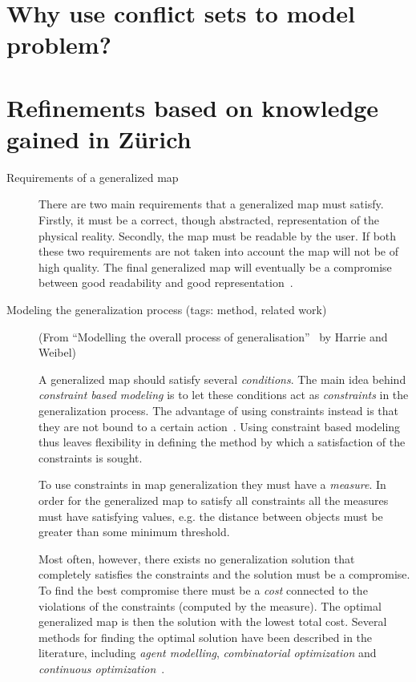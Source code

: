\documentclass[11pt, oneside]{article}   	%
\begin{document}
\section{Why use conflict sets to model problem?}


\section{Refinements based on knowledge gained in Z\"{u}rich}

\begin{description}
\item[Requirements of a generalized map] There are two main requirements that a generalized map must satisfy. Firstly, it must be a correct, though abstracted, representation of the physical reality. Secondly, the map must be readable by the user. If both these two requirements are not taken into account the map will not be of high quality. The final generalized map will eventually be a compromise between good readability and good representation~\cite{harrie2007modelling}.

\item[Modeling the generalization process (tags: method, related work)]  (From ``Modelling the overall process of generalisation''~\cite{harrie2007modelling} by Harrie and Weibel) 

A generalized map should satisfy several \emph{conditions}. The main idea behind \emph{constraint based modeling} is to let these conditions act as \emph{constraints} in the generalization process. The advantage of using constraints instead is that they are not bound to a certain action~\cite{beard1991constraints}. Using constraint based modeling thus leaves flexibility in defining the method by which a satisfaction of the constraints is sought.

To use constraints in map generalization they must have a \emph{measure}. In order for the generalized map to satisfy all constraints all the measures must have satisfying values, e.g. the distance between objects must be greater than some minimum threshold. 

Most often, however, there exists no generalization solution that completely satisfies the constraints and the solution must be a compromise. To find the best compromise there must be a \emph{cost} connected to the violations of the constraints (computed by the measure). The optimal generalized map is then the solution with the lowest total cost. Several methods for finding the optimal solution have been described in the literature, including \emph{agent modelling}, \emph{combinatorial optimization} and \emph{continuous optimization}~\cite{harrie2007modelling}.




\end{description}
\end{document}

